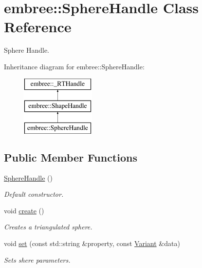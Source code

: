 \hypertarget{classembree_1_1_sphere_handle}{
\section{embree::SphereHandle Class Reference}
\label{classembree_1_1_sphere_handle}
}


Sphere Handle.  


Inheritance diagram for embree::SphereHandle:\begin{figure}[H]
\begin{center}
\leavevmode
\includegraphics[height=3.000000cm]{classembree_1_1_sphere_handle}
\end{center}
\end{figure}
\subsection*{Public Member Functions}
\begin{DoxyCompactItemize}
\item 
\hyperlink{classembree_1_1_sphere_handle_a6290ffae6d31b3a9342139f537cba348}{SphereHandle} ()
\begin{DoxyCompactList}\small\item\em Default constructor. \item\end{DoxyCompactList}\item 
void \hyperlink{classembree_1_1_sphere_handle_a4e520008f643d76d0292f5272a2c42e4}{create} ()
\begin{DoxyCompactList}\small\item\em Creates a triangulated sphere. \item\end{DoxyCompactList}\item 
void \hyperlink{classembree_1_1_sphere_handle_af5087e2534473b8fe63094a78fbe7f41}{set} (const std::string \&property, const \hyperlink{structembree_1_1_variant}{Variant} \&data)
\begin{DoxyCompactList}\small\item\em Sets shere parameters. \item\end{DoxyCompactList}\end{DoxyCompactItemize}
